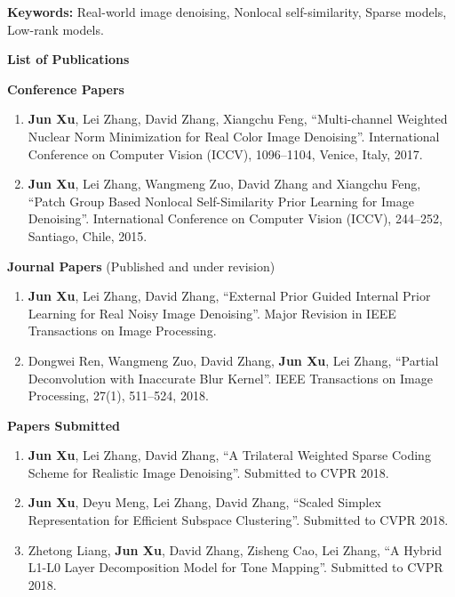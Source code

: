 \documentclass[12pt,oneside]{report}
\numberwithin{figure}{chapter}
\newenvironment{preliminary}%
{\pagestyle{plain}\pagenumbering{roman}}%
{\pagenumbering{arabic}}
\begin{document}
\begin{preliminary}
\textbf{Keywords:} Real-world image denoising, Nonlocal self-similarity, Sparse models, Low-rank models.

\newpage
{}
\Large\begin{center}\textbf{List of Publications}\end{center}\normalsize

\textbf{Conference Papers}
\begin{enumerate}
  \item \textbf{Jun Xu}, Lei Zhang, David Zhang, Xiangchu Feng, ``Multi-channel Weighted Nuclear Norm Minimization for Real Color Image Denoising''. International Conference on Computer Vision (ICCV), 1096--1104, Venice, Italy, 2017.
  \item \textbf{Jun Xu}, Lei Zhang, Wangmeng Zuo, David Zhang and Xiangchu Feng, ``Patch Group Based Nonlocal Self-Similarity Prior Learning for Image Denoising''. International Conference on Computer Vision (ICCV), 244--252, Santiago, Chile, 2015.
\vspace{-2mm}
\end{enumerate}

\textbf{Journal Papers} (Published and under revision)
\begin{enumerate}
 \item \textbf{Jun Xu}, Lei Zhang, David Zhang, ``External Prior Guided Internal Prior Learning for Real Noisy Image Denoising''. Major Revision in IEEE Transactions on Image Processing.
\vspace{-2mm}
  \item Dongwei Ren, Wangmeng Zuo, David Zhang, \textbf{Jun Xu}, Lei Zhang, ``Partial Deconvolution with Inaccurate Blur Kernel''. IEEE Transactions on Image Processing, 27(1), 511--524, 2018. 

\end{enumerate}


\textbf{Papers Submitted}
\begin{enumerate}
 \item \textbf{Jun Xu}, Lei Zhang, David Zhang, ``A Trilateral Weighted Sparse Coding Scheme for Realistic Image Denoising''. Submitted to CVPR 2018.
\vspace{-2mm}
 \item \textbf{Jun Xu}, Deyu Meng, Lei Zhang, David Zhang, ``Scaled Simplex Representation for Efficient Subspace Clustering''. Submitted to CVPR 2018.
\vspace{-2mm}
 \item Zhetong Liang, \textbf{Jun Xu}, David Zhang, Zisheng Cao, Lei Zhang, ``A Hybrid L1-L0 Layer Decomposition Model for Tone Mapping''. Submitted to CVPR 2018.
\end{enumerate}


\end{preliminary}
\end{document}
